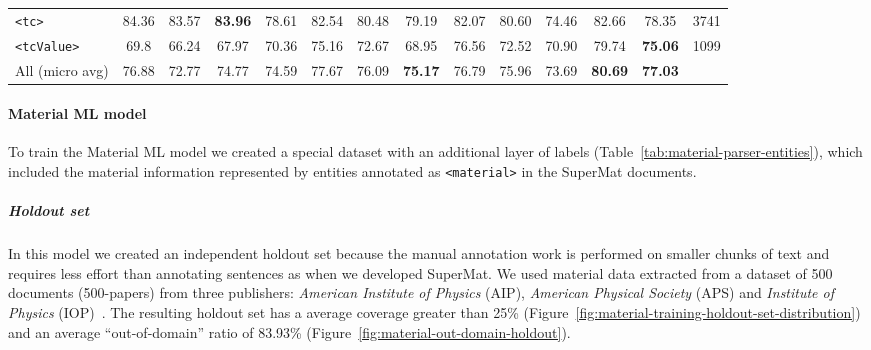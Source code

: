 \documentclass[]{interact}
\theoremstyle{plain}%
\theoremstyle{definition}
\theoremstyle{remark}
\begin{document}
\begin{table}[ht]
{{\begin{tabular}{l ccc ccc ccc ccc r}
            \texttt{<tc>}         & 84.36                            & 83.57                                     & \textbf{83.96}                                     & 78.61      & 82.54      & 80.48          & 79.19          & 82.07      & 80.60          & 74.46      & 82.66          & 78.35          & 3741 \\
            \texttt{<tcValue>}    & 69.8                             & 66.24                                     & 67.97                                              & 70.36      & 75.16      & 72.67          & 68.95          & 76.56      & 72.52          & 70.90      & 79.74          & \textbf{75.06} & 1099 \\
            \midrule
            All (micro avg)       & 76.88                            & 72.77                                     & 74.77                                              & 74.59      & 77.67      & 76.09          & \textbf{75.17} & 76.79      & 75.96          & 73.69      & \textbf{80.69} & \textbf{77.03}        \\
            \bottomrule
        \end{tabular}
    }
    }
    \label{tab:evaluation-superconductors-ML-model}
\end{table}

\paragraph*{Material ML model}

To train the Material ML model we created a special dataset with an additional layer of labels (Table~\ref{tab:material-parser-entities}), which included the material information represented by entities annotated as \texttt{<material>} in the SuperMat documents.

\subparagraph*{Holdout set}
In this model we created an independent holdout set because the manual annotation work is performed on smaller chunks of text and requires less effort than annotating sentences as when we developed SuperMat.
We used material data extracted from a dataset of 500 documents (500-papers) from three publishers: \textit{American Institute of Physics} (AIP), \textit{American Physical Society} (APS) and \textit{Institute of Physics} (IOP)~\cite{foppiano2019proposal}.
The resulting holdout set has a average coverage greater than 25\% (Figure~\ref{fig:material-training-holdout-set-distribution}) and an average ``out-of-domain'' ratio of 83.93\% (Figure~\ref{fig:material-out-domain-holdout}).
\end{document}
